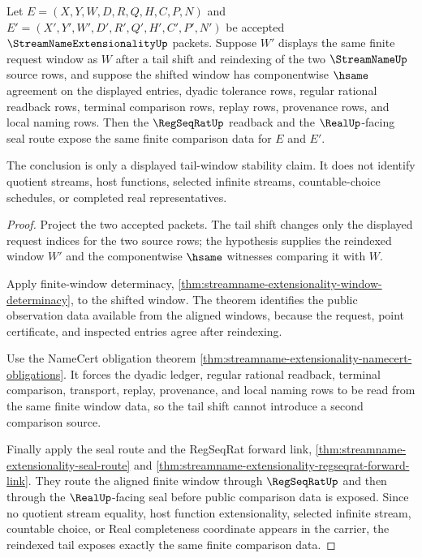 \begin{theorem}
\label{thm:streamname-extensionality-tail-reindex}
Let $E=(X,Y,W,D,R,Q,H,C,P,N)$ and $E'=(X',Y',W',D',R',Q',H',C',P',N')$ be accepted $\StreamNameExtensionalityUp$ packets. Suppose $W'$ displays the same finite request window as $W$ after a tail shift and reindexing of the two $\StreamNameUp$ source rows, and suppose the shifted window has componentwise $\hsame$ agreement on the displayed entries, dyadic tolerance rows, regular rational readback rows, terminal comparison rows, replay rows, provenance rows, and local naming rows. Then the $\RegSeqRatUp$ readback and the $\RealUp$-facing seal route expose the same finite comparison data for $E$ and $E'$.

The conclusion is only a displayed tail-window stability claim. It does not identify quotient streams, host functions, selected infinite streams, countable-choice schedules, or completed real representatives.
\end{theorem}
\begin{proof}
Project the two accepted packets. The tail shift changes only the displayed request indices for the two source rows; the hypothesis supplies the reindexed window $W'$ and the componentwise $\hsame$ witnesses comparing it with $W$.

Apply finite-window determinacy, \autoref{thm:streamname-extensionality-window-determinacy}, to the shifted window. The theorem identifies the public observation data available from the aligned windows, because the request, point certificate, and inspected entries agree after reindexing.

Use the NameCert obligation theorem \autoref{thm:streamname-extensionality-namecert-obligations}. It forces the dyadic ledger, regular rational readback, terminal comparison, transport, replay, provenance, and local naming rows to be read from the same finite window data, so the tail shift cannot introduce a second comparison source.

Finally apply the seal route and the RegSeqRat forward link, \autoref{thm:streamname-extensionality-seal-route} and \autoref{thm:streamname-extensionality-regseqrat-forward-link}. They route the aligned finite window through $\RegSeqRatUp$ and then through the $\RealUp$-facing seal before public comparison data is exposed. Since no quotient stream equality, host function extensionality, selected infinite stream, countable choice, or Real completeness coordinate appears in the carrier, the reindexed tail exposes exactly the same finite comparison data.
\end{proof}
